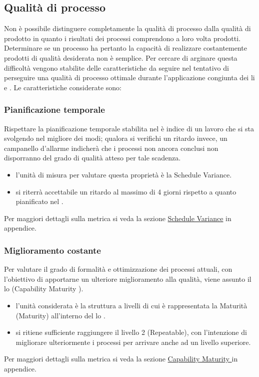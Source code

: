 \documentclass[a4paper, titlepage]{article}
\begin{document}
\subsection{Qualità di processo}
Non è possibile distinguere completamente la qualità di processo dalla qualità di prodotto in quanto i risultati dei processi comprendono a loro volta prodotti. Determinare se un processo ha pertanto la capacità di realizzare costantemente prodotti di qualità desiderata non è semplice. 
\newline Per cercare di arginare questa difficoltà vengono stabilite delle caratteristiche da seguire nel tentativo di perseguire una qualità di processo ottimale durante l'applicazione congiunta dei li  e .
\newline Le caratteristiche considerate sono:

\subsubsection{Pianificazione temporale}
Rispettare la pianificazione temporale stabilita nel  è indice di un lavoro che si sta svolgendo nel migliore dei modi; qualora si verifichi un ritardo invece, un campanello d'allarme indicherà che i processi non ancora conclusi non disporranno del grado di qualità atteso per tale scadenza.
\begin{itemize}
\item {} l'unità di misura per valutare questa proprietà è la Schedule Variance.
\item {} si riterrà accettabile un ritardo al massimo di 4 giorni rispetto a quanto pianificato nel .
\end{itemize}
Per maggiori dettagli sulla metrica si veda la sezione \hyperref[par:SV]{Schedule Variance} in appendice.

\subsubsection{Miglioramento costante}
Per valutare il grado di formalità e ottimizzazione dei processi attuali, con l'obiettivo di apportarne un ulteriore miglioramento alla qualità, viene assunto il lo  (Capability Maturity ).
\begin{itemize}
\item {} l'unità considerata è la struttura a livelli di cui è rappresentata la Maturità (Maturity) all'interno del lo .
\item {} si ritiene sufficiente raggiungere il livello 2 (Repeatable), con l'intenzione di migliorare ulteriormente i processi per arrivare anche ad un livello superiore.
\end{itemize}
Per maggiori dettagli sulla metrica si veda la sezione \hyperref[par:cmm]{Capability Maturity } in appendice. 
\end{document}
